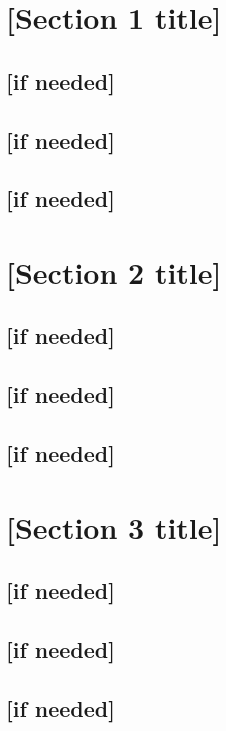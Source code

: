 \documentclass[11pt]{article}
\begin{document}
\tableofcontents
\newpage
\newpage

\section{[Section 1 title]}
	\subsection{[if needed]}
	\subsection{[if needed]}
	\subsection{[if needed]}
	
\newpage
	
\section{[Section 2 title]}
	\subsection{[if needed]}
	\subsection{[if needed]}
	\subsection{[if needed]}

\newpage

\section{[Section 3 title]}
	\subsection{[if needed]}
	\subsection{[if needed]}
	\subsection{[if needed]}
\end{document}
